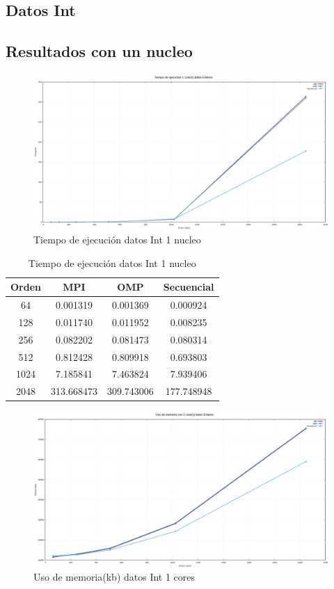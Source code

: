 \documentclass[10pt]{IEEEtran}
\begin{document}
\subsection{Datos Int}

\subsection{Resultados con un nucleo}

\begin{figure}[H]
  \centering
  \includegraphics[width=0.95\linewidth]{figs/1nucleoEnterosTiempo.png}
  \caption{Tiempo de ejecución datos Int 1 nucleo}
  \label{fig:int}
\end{figure}

\begin{table}[H]
  \caption{Tiempo de ejecución datos Int 1 nucleo}
  \label{table_example}
  \centering
  \begin{tabular}{|c|c|c|c|}
    \hline
    \textbf{Orden} & \textbf{MPI} & \textbf{OMP} & \textbf{Secuencial} \\
    \hline
    64 & 0.001319 & 0.001369 & 0.000924 \\
    128 & 0.011740 & 0.011952 & 0.008235 \\
    256 & 0.082202 & 0.081473 & 0.080314 \\
    512 & 0.812428 & 0.809918 & 0.693803 \\
    1024 & 7.185841 & 7.463824 & 7.939406 \\
    2048 & 313.668473 & 309.743006 & 177.748948 \\
    \hline
  \end{tabular}
\end{table}

\begin{figure}[H]
  \centering
  \includegraphics[width=0.95\linewidth]{figs/1nucleoEnterosMemoria.png}
  \caption{Uso de memoria(kb) datos Int 1 cores}
  \label{fig:int2}
\end{figure}
\end{document}
